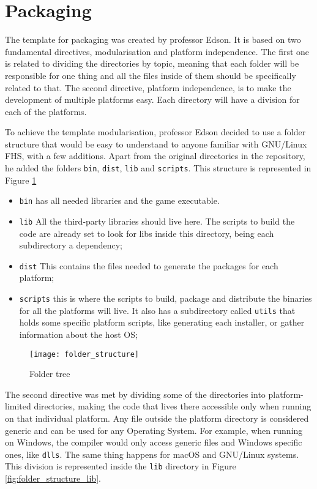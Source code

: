 \section{Packaging}
\label{sec:packaging}

The template for packaging was created by professor Edson. It is based on two fundamental directives, modularisation and platform independence. The first one is related to dividing the directories by topic, meaning that each folder will be responsible for one thing and all the files inside of them should be specifically related to that. The second directive, platform independence, is to make the development of multiple platforms easy. Each directory will have a division for each of the platforms.

To achieve the template modularisation, professor Edson decided to use a folder structure that would be easy to understand to anyone familiar with GNU/Linux FHS, with a few additions. Apart from the original directories in the repository, he added the folders \texttt{bin}, \texttt{dist}, \texttt{lib} and \texttt{scripts}. This structure is represented in Figure \ref{fig:folder_structure}

\begin{itemize}

\item \texttt{bin} has all needed libraries and the game executable.
\item \texttt{lib} All the third-party libraries should live here. The scripts to build the code are already set to look for libs inside this directory, being each subdirectory a dependency;
\item \texttt{dist} This contains the files needed to generate the packages for each platform;
\item \texttt{scripts} this is where the scripts to build, package and distribute the binaries for all the platforms will live. It also has a subdirectory called \texttt{utils} that holds some specific platform scripts, like generating each installer, or gather information about the host OS;
\end{itemize}

\begin{figure}[h!]
\centering
\texttt{[image: folder\_structure]}
\caption{Folder tree}
\label{fig:folder_structure}
\end{figure}

The second directive was met by dividing some of the directories into platform-limited directories, making the code that lives there accessible only when running on that individual platform. Any file outside the platform directory is considered generic and can be used for any Operating System. For example, when running on Windows, the compiler would only access generic files and Windows specific ones, like \texttt{dlls}. The same thing happens for macOS and GNU/Linux systems. This division is represented inside the \texttt{lib} directory in Figure \ref{fig:folder_structure_lib}.

